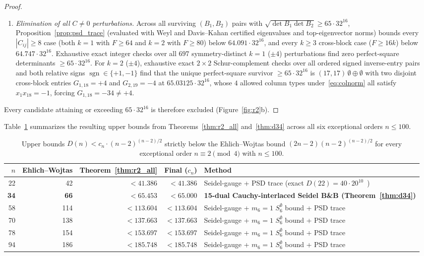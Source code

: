 \documentclass[11pt]{article}
\theoremstyle{remark}
\begin{document}
\begin{proof}
\begin{enumerate}[leftmargin=*,topsep=2pt,itemsep=1pt]
\item \emph{Elimination of all $C \ne 0$ perturbations.} Across all surviving $(B_1, B_2)$ pairs with $\sqrt{\det B_1 \det B_2} \ge 65 \cdot 32^{16}$, Proposition~\ref{prop:psd_trace} (evaluated with Weyl and Davis--Kahan certified eigenvalues and top-eigenvector norms) bounds every $|C_{ij}| \ge 8$ case (both $k = 1$ with $F \ge 64$ and $k = 2$ with $F \ge 80$) below $64.091 \cdot 32^{16}$, and every $k \ge 3$ cross-block case ($F \ge 16k$) below $64.747 \cdot 32^{16}$. Exhaustive exact integer checks over all $697$ symmetry-distinct $k = 1$ ($\pm 4$) perturbations find zero perfect-square determinants $\ge 65 \cdot 32^{16}$. For $k = 2$ ($\pm 4$), exhaustive exact $2 \times 2$ Schur-complement checks over all ordered signed inverse-entry pairs and both relative signs $\operatorname{sgn} \in \{+1, -1\}$ find that the unique perfect-square survivor $\ge 65 \cdot 32^{16}$ is $(17, 17)\,\emptyset \oplus \emptyset$ with two disjoint cross-block entries $G_{1,18} = +4$ and $G_{2,19} = -4$ at $65.03125 \cdot 32^{16}$, whose $4$ allowed column types under~\eqref{eq:colnorm} all satisfy $x_1 x_{18} = -1$, forcing $G_{1,18} = -34 \ne +4$.
\end{enumerate}
Every candidate attaining or exceeding $65 \cdot 32^{16}$ is therefore excluded (Figure~\ref{fig:r2}b).
\end{proof}

Table~\ref{tab:r2ub} summarizes the resulting upper bounds from Theorems~\ref{thm:r2_all} and~\ref{thm:d34} across all six exceptional orders $n \le 100$.

\begin{table}[ht]
\centering
\caption{Upper bounds $D(n) < c_n \cdot (n - 2)^{(n-2)/2}$ strictly below the Ehlich--Wojtas bound $(2n - 2)(n - 2)^{(n-2)/2}$ for every exceptional order $n \equiv 2 \pmod 4$ with $n \le 100$.}
\label{tab:r2ub}
\footnotesize
\begin{tabular}{@{}rrrrl@{}}
\toprule
\textbf{$n$} & \textbf{Ehlich--Wojtas} & \textbf{Theorem~\ref{thm:r2_all}} & \textbf{Final ($c_n$)} & \textbf{Method} \\
\midrule
22 & 42  & $< 41.386$  & $< 41.386$  & Seidel-gauge + PSD trace (exact $D(22) = 40 \cdot 20^{10}$~\cite{chasiotis2018}) \\
\textbf{34} & \textbf{66}  & $< 65.453$ & \textbf{$< 65.000$} & \textbf{15-dual Cauchy-interlaced Seidel B\&B (Theorem~\ref{thm:d34})} \\
58 & 114 & $< 113.604$ & $< 113.604$ & Seidel-gauge + $m_6 = 1$ $S_6^{\emptyset}$ bound + PSD trace \\
70 & 138 & $< 137.663$ & $< 137.663$ & Seidel-gauge + $m_6 = 1$ $S_6^{\emptyset}$ bound + PSD trace \\
78 & 154 & $< 153.697$ & $< 153.697$ & Seidel-gauge + $m_6 = 1$ $S_6^{\emptyset}$ bound + PSD trace \\
94 & 186 & $< 185.748$ & $< 185.748$ & Seidel-gauge + $m_6 = 1$ $S_6^{\emptyset}$ bound + PSD trace \\
\bottomrule
\end{tabular}
\end{table}
\end{document}
